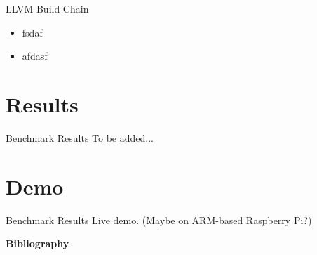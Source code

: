 \documentclass{beamer}
\begin{document}
\begin{frame}{LLVM Build Chain}
\begin{itemize}
  \item<1->fsdaf
  \item<2->afdasf
  \end{itemize}
\end{frame}

\section{Results}

\begin{frame}{Benchmark Results}
  To be added...
\end{frame}

\section{Demo}

\begin{frame}{Benchmark Results}
  Live demo. (Maybe on ARM-based Raspberry Pi?)
\end{frame}

\begin{frame}[t,allowframebreaks]{\bf Bibliography}
  \nocite{*}
  \printbibliography
\end{frame}
\end{document}
